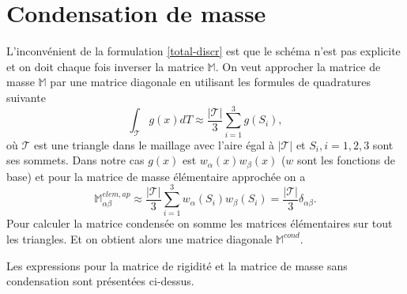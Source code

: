\documentclass[12pt]{article}
\begin{document}
\section{Condensation de masse}
L'inconvénient de la formulation \eqref{total-discr} est que le schéma n'est pas explicite et on doit chaque fois inverser la matrice $\mathbb{M}$. On veut approcher la matrice de masse $\mathbb{M}$ par une matrice diagonale en utilisant les formules de quadratures suivante
\begin{equation*}
	\int_{\mathcal{T}}{g(x) dT} \approx \frac{|\mathcal{T}|}{3}\sum_{i = 1}^3{g(S_i)},
\end{equation*}
où $\mathcal{T}$ est une triangle dans le maillage avec l'aire égal à $|\mathcal{T}|$ et $S_i, i = 1,2,3$ sont ses sommets.
Dans notre cas $g(x)$ est $w_\alpha(x)w_\beta(x)$ ($w$ sont les fonctions de base) et pour la matrice de masse élémentaire approchée on a 
\begin{equation*}
\mathbb{M}^{elem, ap}_{\alpha \beta} \approx \frac{|\mathcal{T}|}{3}\sum_{i=1}^{3} {w_\alpha(S_i) w_\beta(S_i)} = \frac{|\mathcal{T}|}{3} \delta_{\alpha \beta}.
\end{equation*}
Pour calculer la matrice condensée on somme les matrices élémentaires sur tout les triangles. Et on obtient alors une matrice diagonale $\mathbb{M}^{cond}$.

Les expressions pour la matrice de rigidité et la matrice de masse sans condensation sont présentées ci-dessus.
\end{document}

